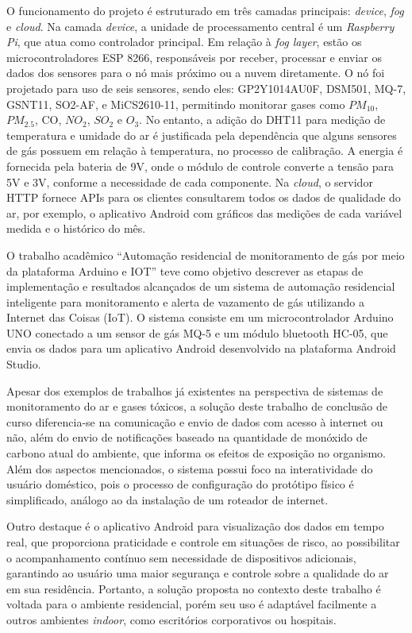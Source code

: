 O funcionamento do projeto é estruturado em três camadas principais: \textit{device}, \textit{fog} e \textit{cloud}. Na camada \textit{device}, 
a unidade de processamento central é um \textit{Raspberry Pi}, que atua como controlador principal. Em relação à \textit{fog layer}, estão os microcontroladores ESP 8266, responsáveis por receber, processar e 
enviar os dados dos sensores para o nó mais próximo ou a nuvem diretamente. O nó foi projetado para uso de seis sensores, sendo eles: GP2Y1014AU0F, DSM501, MQ-7, GSNT11, SO2-AF,
e MiCS2610-11, permitindo monitorar gases como $PM_{10}$, ${PM_{2.5}}$, CO, $NO_{2}$, $SO_{2}$ e $O_{3}$. No entanto, a adição do DHT11 para medição de temperatura e umidade do ar é justificada 
pela dependência que alguns sensores de gás possuem em relação à temperatura, no processo de calibração. A energia é fornecida pela bateria de 9V, onde o módulo de controle converte a tensão para 5V e 3V, conforme a 
necessidade de cada componente. Na \textit{cloud}, o servidor HTTP fornece APIs para os clientes consultarem todos os dados de qualidade do ar, por exemplo, o aplicativo Android com 
gráficos das medições de cada variável medida e o histórico do mês.

O trabalho acadêmico ``Automação residencial de monitoramento de gás por meio da plataforma Arduino e IOT'' \cite{sistema-antivazamento} teve como objetivo descrever as etapas de implementação e resultados alcançados de um sistema de automação 
residencial inteligente para monitoramento e alerta de vazamento de gás utilizando a Internet das Coisas (IoT). O sistema consiste em um microcontrolador Arduino UNO 
conectado a um sensor de gás MQ-5 e um módulo bluetooth HC-05, que envia os dados para um aplicativo Android desenvolvido na plataforma Android Studio.

Apesar dos exemplos de trabalhos já existentes na perspectiva de sistemas de monitoramento do ar e gases tóxicos, a solução deste trabalho de conclusão de curso diferencia-se na comunicação e envio de dados com acesso à internet ou não, além do envio de notificações 
baseado na quantidade de monóxido de carbono atual do ambiente, que informa os efeitos de exposição no organismo. Além dos aspectos mencionados, o sistema possui foco na interatividade do usuário doméstico, pois o processo de configuração do protótipo físico é
simplificado, análogo ao da instalação de um roteador de internet.

Outro destaque é o aplicativo Android para visualização dos dados em tempo real, que proporciona praticidade e controle em situações de risco, ao possibilitar o acompanhamento contínuo 
sem necessidade de dispositivos adicionais, garantindo ao usuário uma maior segurança e controle sobre a qualidade do ar em sua residência. Portanto, a solução proposta no contexto deste trabalho é voltada para o ambiente residencial, porém seu uso é adaptável facilmente a outros ambientes \textit{indoor}, como escritórios corporativos ou hospitais. 